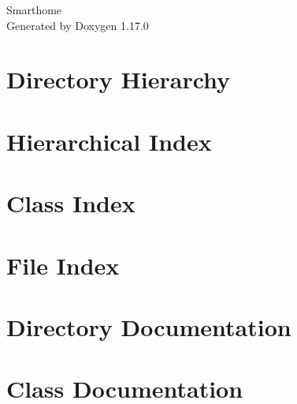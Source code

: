 \documentclass[twoside]{book}
\newcommand{\+}{\discretionary{\mbox{\scriptsize$\hookleftarrow$}}{}{}}
\newcommand{\clearemptydoublepage}{%
    \newpage{\pagestyle{empty}\cleardoublepage}%
  }
\begin{document}
  \raggedbottom
    \hypersetup{pageanchor=false,
                bookmarksnumbered=true,
                pdfencoding=unicode
               }
  \begin{titlepage}
  \vspace*{7cm}
  \begin{center}%
  {\Large Smarthome}\\
  \vspace*{1cm}
  {\large Generated by Doxygen 1.17.0}\\
  \end{center}
  \end{titlepage}
  \clearemptydoublepage
  \tableofcontents
  \clearemptydoublepage
  \hypersetup{pageanchor=true}
\chapter{Directory Hierarchy}

\chapter{Hierarchical Index}

\chapter{Class Index}

\chapter{File Index}

\chapter{Directory Documentation}

\chapter{Class Documentation}




















\end{document}
